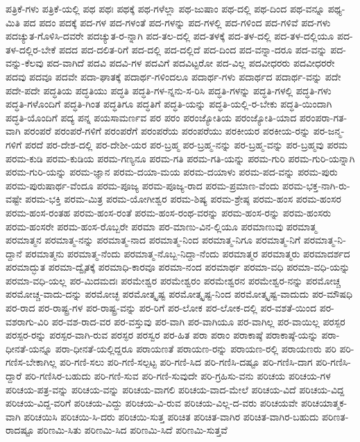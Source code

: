 {ಪತ್ರಿಕೆ-ಗಳು
ಪತ್ರಿಕೆ-ಯಲ್ಲಿ
ಪಥ
ಪಥಃ
ಪಥಕ್ಕೆ
ಪಥ-ಗಳೆಲ್ಲಾ
ಪಥ-ಜುಷಾಂ
ಪಥ-ದಲ್ಲಿ
ಪಥ-ದಿಂದ
ಪಥ-ವನ್ನೂ
ಪಥ್ಯ-ಮಿತಿ
ಪದ
ಪದಂ
ಪದಕ್ಕೆ
ಪದ-ಗಳ
ಪದ-ಗಳಂತೆ
ಪದ-ಗಳನ್ನು
ಪದ-ಗಳಲ್ಲಿ
ಪದ-ಗಳಿಂದ
ಪದ-ಗಳಿವೆ
ಪದ-ಗಳು
ಪದಚ್ಯುತ-ಗೊಳಿಸಿ-ದವರೇ
ಪದಚ್ಯುತ-ರ-ನ್ನಾಗಿ
ಪದ-ತಲ-ದಲ್ಲಿ
ಪದ-ತಳಕ್ಕೆ
ಪದ-ತಳ-ದಲ್ಲಿ
ಪದ-ತಳ-ದಲ್ಲಿಯೂ
ಪದ-ತಳ-ದಲ್ಲಿರ-ಬೇಕೆ
ಪದದ
ಪದ-ದಲಿತ-ರಿಗೆ
ಪದ-ದಲ್ಲಿ
ಪದ-ದಲ್ಲಿದೆ
ಪದ-ದಿಂದ
ಪದ-ವನ್ನಾ-ದರೂ
ಪದ-ವನ್ನು
ಪದ-ವನ್ನು-ಕೆಲವು
ಪದ-ವಾಗಿದೆ
ಪದವಿ
ಪದವಿ-ಗಳ
ಪದವಿಗೆ
ಪದವಿಟ್ಟರೋ
ಪದ-ವಿಲ್ಲ
ಪದವೀಧರರು
ಪದವೀಧರರೇ
ಪದವು
ಪದವೂ
ಪದವೇ
ಪದಾ-ಘಾತಕ್ಕೆ
ಪದಾರ್ಥ-ಗಳಿಂದಲೂ
ಪದಾರ್ಥ-ಗಳು
ಪದಾರ್ಥದ
ಪದಾರ್ಥ-ವನ್ನು
ಪದೇ
ಪದೇ-ಪದೇ
ಪದ್ಧತಿಯ
ಪದ್ಧತಿಯು
ಪದ್ಧತಿ
ಪದ್ಧತಿ-ಗಳ-ನ್ನನು-ಸ-ರಿಸಿ
ಪದ್ಧತಿ-ಗಳನ್ನು
ಪದ್ಧತಿ-ಗಳಲ್ಲಿ
ಪದ್ಧತಿ-ಗಳು
ಪದ್ಧತಿ-ಗಳೊಂದಿಗೆ
ಪದ್ಧತಿ-ಗಿಂತ
ಪದ್ಧತಿಗೂ
ಪದ್ಧತಿಗೆ
ಪದ್ಧತಿ-ಯನ್ನು
ಪದ್ಧತಿ-ಯಲ್ಲಿ-ರ-ಬೇಕು
ಪದ್ಧತಿ-ಯಿಂದಾಗಿ
ಪದ್ಧತಿ-ಯೊಂದಿಗೆ
ಪದ್ಯ
ಪನ್ನ
ಪಯಸಾಮರ್ಣವ
ಪರ
ಪರಂ
ಪರಂಜ್ಯೋತಿಯ
ಪರಂಜ್ಯೋತಿ-ಯಾದ
ಪರಂಪರಾ-ಗತ-ವಾಗಿ
ಪರಂಪರೆ
ಪರಂಪರೆ-ಗಳಿಗೆ
ಪರಂಪರೆಗೆ
ಪರಂಪರೆಯ
ಪರಂಪರೆಯು
ಪರಕೀಯರ
ಪರಕೀಯ-ರನ್ನು
ಪರ-ಜನ್ಮ-ಗಳಿಗೆ
ಪರದೆ
ಪರ-ದೇಶ-ದಲ್ಲಿ
ಪರ-ದೇಶೀ-ಯರ
ಪರ-ಬ್ರಹ್ಮ
ಪರ-ಬ್ರಹ್ಮ-ನನ್ನು
ಪರ-ಬ್ರಹ್ಮ-ವನ್ನು
ಪರ-ಬ್ರಹ್ಮವು
ಪರಮ
ಪರಮ-ಕುಡಿ
ಪರಮ-ಕುಡಿಯ
ಪರಮ-ಗಣ್ಯನೂ
ಪರಮ-ಗತಿ
ಪರಮ-ಗತಿ-ಯನ್ನು
ಪರಮ-ಗುರಿ
ಪರಮ-ಗುರಿ-ಯನ್ನಾಗಿ
ಪರಮ-ಗುರಿ-ಯನ್ನು
ಪರಮ-ಜ್ಞಾನ
ಪರಮ-ದಯಾ-ಮಯ
ಪರಮ-ದಯಾಳು
ಪರಮ-ಪದ-ವನ್ನು
ಪರಮ-ಪುರು
ಪರಮ-ಪುರುಷಾರ್ಥ-ವೆಂದೂ
ಪರಮ-ಪೂಜ್ಯ
ಪರಮ-ಪೂಜ್ಯ-ರಾದ
ಪರಮ-ಪ್ರಮಾಣ-ವೆಂದು
ಪರಮ-ಭಕ್ತ-ನಾಗಿ-ರು-ವಷ್ಟೇ
ಪರಮ-ಭಕ್ತಿ
ಪರಮ-ಮಿತ್ರ
ಪರಮ-ಯೋಗೀಶ್ವರ
ಪರಮ-ಶಿಷ್ಯ
ಪರಮ-ಶ್ರೇಷ್ಠ
ಪರಮ-ಹಂಸ
ಪರಮ-ಹಂಸರ
ಪರಮ-ಹಂಸ-ರಂತಹ
ಪರಮ-ಹಂಸ-ರಂತೆ
ಪರಮ-ಹಂಸ-ರಂಥ-ವರನ್ನು
ಪರಮ-ಹಂಸ-ರನ್ನು
ಪರಮ-ಹಂಸರು
ಪರಮ-ಹಂಸರೇ
ಪರಮ-ಹಂಸ-ರೊಬ್ಬರೇ
ಪರಮಾ
ಪರ-ಮಾಣು-ವಿನ-ಲ್ಲಿಯೂ
ಪರಮಾಣುವು
ಪರಮಾತ್ಮ
ಪರಮಾತ್ಮನ
ಪರಮಾತ್ಮ-ನನ್ನು
ಪರಮಾತ್ಮ-ನಾದ
ಪರಮಾತ್ಮ-ನಿಂದ
ಪರಮಾತ್ಮ-ನಿಗೂ
ಪರಮಾತ್ಮ-ನಿಗೆ
ಪರಮಾತ್ಮ-ನಿ-ದ್ದಾನೆ
ಪರಮಾತ್ಮನು
ಪರಮಾತ್ಮ-ನೆಂದು
ಪರಮಾತ್ಮ-ನೊಬ್ಬ-ನಿದ್ದಾ-ನೆಂದು
ಪರಮಾತ್ಮರ
ಪರಮಾತ್ಮರು
ಪರಮಾದರ್ಶದ
ಪರಮಾದ್ಭುತ
ಪರಮಾ-ದ್ವೈತಕ್ಕೆ
ಪರಮಾಧಿ-ಕಾರವೂ
ಪರಮಾ-ನಂದ
ಪರಮಾರ್ಥ
ಪರಮಾ-ವಧಿ
ಪರಮಾ-ವಧಿ-ಯನ್ನು
ಪರಮಾ-ವಧಿ-ಯಲ್ಲ
ಪರ-ಮಿದಮದಃ
ಪರಮೇಶ್ವರ
ಪರಮೇಶ್ವರಂ
ಪರಮೇಶ್ವರನ
ಪರಮೇಶ್ವರ-ನನ್ನು
ಪರಮೋಚ್ಚ
ಪರಮೋಚ್ಚ-ವಾದು-ದನ್ನು
ಪರಮೋಚ್ಛ
ಪರಮೋತ್ಕೃಷ್ಟ
ಪರಮೋತ್ಕೃಷ್ಟ-ನಿಂದ
ಪರಮೋತ್ಕೃಷ್ಟ-ವಾದುದು
ಪರ-ಮೌಷಧಿ
ಪರ-ರಾದ
ಪರ-ರಾಷ್ಟ್ರ-ಗಳ
ಪರ-ರಾಷ್ಟ್ರ-ವನ್ನು
ಪರ-ರಿಗೆ
ಪರ-ಲೋಕ
ಪರ-ಲೋಕ-ದಲ್ಲಿ
ಪರ-ವಶತೆ-ಯಿಂದ
ಪರ-ವಶರಾಗು-ವಿರಿ
ಪರ-ವಶ-ರಾದ-ವರ
ಪರ-ವಸ್ತುವು
ಪರ-ವಾಗಿ
ಪರ-ವಾಗಿಯೂ
ಪರ-ವಾಗಿಲ್ಲ
ಪರ-ವಾಯಿಲ್ಲ
ಪರಸ್ಪರ
ಪರಸ್ಪರ-ರನ್ನು
ಪರಸ್ಪರ-ವಾಗಿ-ರುವ
ಪರಸ್ಫರ
ಪರಸ್ವರ
ಪರ-ಹಿತ
ಪರಾ
ಪರಾಂ
ಪರಾಕಾಷ್ಠೆ
ಪರಾಕಾಷ್ಠೆ-ಯನ್ನು
ಪರಾ-ಧೀನತೆ-ಯನ್ನೂ
ಪರಾ-ಧೀನತೆ-ಯಲ್ಲಿದ್ದರೂ
ಪರಾಯಣತೆ
ಪರಾಯಣ-ರನ್ನು
ಪರಾಯಣ-ರಲ್ಲಿ
ಪರಾಯಣರು
ಪರಿ
ಪರಿ-ಗಣಿಸ-ಬೇಕಾಗಿಲ್ಲ
ಪರಿ-ಗಣಿ-ಸಲು
ಪರಿ-ಗಣಿ-ಸಲ್ಪಟ್ಟ
ಪರಿ-ಗಣಿ-ಸಿದ
ಪರಿ-ಗಣಿಸಿ-ದಷ್ಟೂ
ಪರಿ-ಗಣಿಸಿ-ದಾಗ
ಪರಿ-ಗಣಿಸಿ-ದ್ದಾರೆ
ಪರಿ-ಗಣಿಸಿರ-ಬಹುದು
ಪರಿ-ಗಣಿ-ಸುವ
ಪರಿ-ಗಣಿ-ಸುವುದೇ
ಪರಿ-ಗ್ರಹಿಸು-ವನು
ಪರಿಚಯ
ಪರಿಚಯ-ಗಳ
ಪರಿಚಯ-ಪತ್ರ-ವನ್ನು
ಪರಿಚಯ-ವನ್ನು
ಪರಿಚಯ-ವಾಗಲಿ
ಪರಿಚಯ-ವಾದ-ಮೇಲೆ
ಪರಿಚಯ-ವಿದೆ
ಪರಿಚಯ-ವಿದ್ದ
ಪರಿಚಯ-ವಿದ್ದ-ವರಿಗೆ
ಪರಿಚಯ-ವಿದ್ದು
ಪರಿಚಯ-ವಿ-ರುವ
ಪರಿಚಯ-ವಿಲ್ಲ-ದ-ವರು
ಪರಿಚಯವೇ
ಪರಿಚಯಾತ್ಮಕ-ವಾಗಿ
ಪರಿಚಯಿಸಿ
ಪರಿಚಯಿ-ಸಿ-ದರು
ಪರಿಚಯಿ-ಸುತ್ತ
ಪರಿಚಿತ
ಪರಿಚಿತ-ವಾಗಿರ
ಪರಿಚಿತ-ವಾಗಿರ-ಬಹುದು
ಪರಿಣತ-ರಾದಷ್ಟೂ
ಪರಿಣಮಿ-ಸಿತು
ಪರಿಣಮಿ-ಸಿದ
ಪರಿಣಮಿ-ಸಿದೆ
ಪರಿಣಮಿ-ಸುತ್ತವೆ
}

